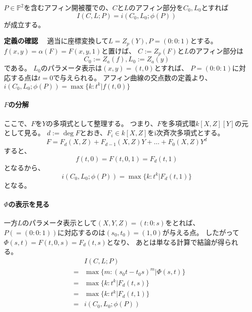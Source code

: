 \documentclass[a4]{article}
\newcommand{\proj}{\mathbb{P}}
\begin{document}
        \begin{Prop}
            $P \in \proj^2$を含むアフィン開被覆での、$C$と$L$のアフィン部分を$C_0, L_0$とすれば
            \[ I(C, L; P)=i(C_0, L_0; \phi(P)) \]
            が成立する。
        \end{Prop}
        \begin{Proof}
            \textbf{定義の確認}~~
            適当に座標変換して$L=Z_p(Y), P=(0:0:1)$とする。
            $f(x, y)=\alpha(F)=F(x, y, 1)$と置けば、
            $C:=Z_p(F)$と$L$のアフィン部分は
            \[ C_0:=Z_a(f), L_0:=Z_a(y) \]
            である。
            $L_0$のパラメータ表示は$(x, y)=(t, 0)$とすれば、
            $P=(0:0:1)$に対応する点は$t=0$で与えられる。
            アフィン曲線の交点数の定義より、
            $i(C_0, L_0; \phi(P))=\max \{ k : t^k|f(t,0) \}$
            
            \paragraph{$F$の分解}
            ここで、$F$を$Y$の多項式として整理する。
            つまり、$F$を多項式環$k[X, Z][Y]$の元として見る。
            $d:=\deg F$とおき、$F_i \in k[X, Z]$をi次斉次多項式とする。
            \[ F=F_d(X, Z)+F_{d-1}(X, Z)Y + \dots + F_0(X, Z) Y^d \]
            すると、
            \[ f(t, 0)=F(t, 0, 1)=F_d(t, 1) \]
            となるから、
            \[ i(C_0, L_0; \phi(P))=\max \{ k : t^k|F_d(t,1) \} \]
            となる。

            \paragraph{$\Phi$の表示を見る}
            一方$L$のパラメータ表示として$(X, Y, Z)=(t:0:s)$をとれば、
            $P(=(0:0:1))$に対応するのは$(s_0,t_0)=(1,0)$が与える点。
            したがって$\Phi(s, t)=F(t, 0, s)=F_d(t, s)$となり、
            あとは単なる計算で結論が得られる。
            \begin{eqnarray*}
                &{}&    I(C, L; P) \\
                &=&     \max \{ m : (s_0 t-t_0 s)^m | \Phi(s,t) \} \\
                &=&     \max \{ k : t^k|F_d(t,s) \} \\
                &=&     \max \{ k : t^k|F_d(t,1) \} \\
                &=&     i(C_0, L_0; \phi(P)) \\
            \end{eqnarray*}
            \QED
        \end{Proof}
\end{document}
